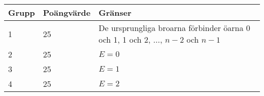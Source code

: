 \noindent
\begin{tabular}{| l | l | l |}
\hline
Grupp & Poängvärde & Gränser \\ \hline
	1     & 25         & De ursprungliga broarna förbinder öarna 0 och 1, 1 och 2, $\dots$, $n - 2$ och $n - 1$\\ \hline
	2     & 25         & $E = 0$ \\ \hline
	3     & 25         & $E = 1$ \\ \hline
	4     & 25         & $E = 2$ \\ \hline
\end{tabular}

